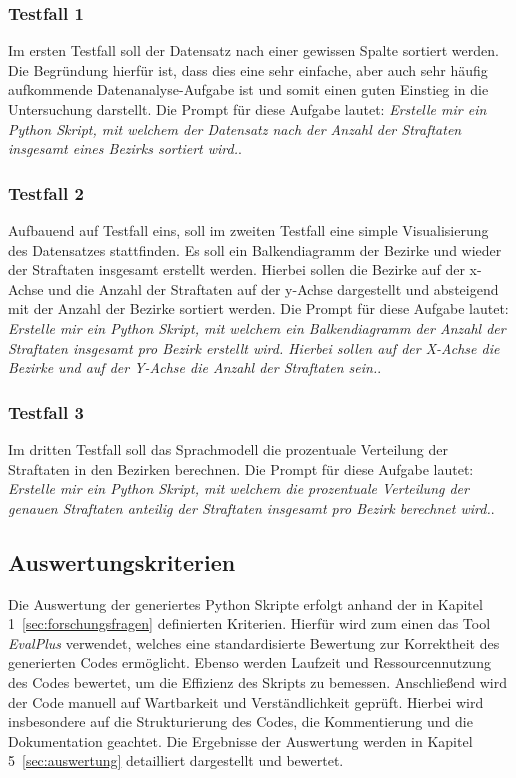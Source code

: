\documentclass[11pt,a4paper]{article}
\begin{document}
\subsubsection{Testfall 1}
    Im ersten Testfall soll der Datensatz nach einer gewissen Spalte sortiert werden. Die Begründung hierfür ist, dass dies eine sehr einfache, aber auch sehr häufig aufkommende Datenanalyse-Aufgabe ist und somit einen guten Einstieg in die Untersuchung darstellt. Die Prompt für diese Aufgabe lautet: \emph{Erstelle mir ein Python Skript, mit welchem der Datensatz nach der Anzahl der Straftaten insgesamt eines Bezirks sortiert wird.}.

\subsubsection{Testfall 2}
    Aufbauend auf Testfall eins, soll im zweiten Testfall eine simple Visualisierung des Datensatzes stattfinden. Es soll ein Balkendiagramm der Bezirke und wieder der Straftaten insgesamt erstellt werden. Hierbei sollen die Bezirke auf der x-Achse und die Anzahl der Straftaten auf der y-Achse dargestellt und absteigend mit der Anzahl der Bezirke sortiert werden. Die Prompt für diese Aufgabe lautet: \emph{Erstelle mir ein Python Skript, mit welchem ein Balkendiagramm der Anzahl der Straftaten insgesamt pro Bezirk erstellt wird. Hierbei sollen auf der X-Achse die Bezirke und auf der Y-Achse die Anzahl der Straftaten sein.}.

\subsubsection{Testfall 3}
    Im dritten Testfall soll das Sprachmodell die prozentuale Verteilung der Straftaten in den Bezirken berechnen. Die Prompt für diese Aufgabe lautet: \emph{Erstelle mir ein Python Skript, mit welchem die prozentuale Verteilung der genauen Straftaten anteilig der Straftaten insgesamt pro Bezirk berechnet wird.}.


\subsection{Auswertungskriterien}
\label{sec:auswertungskriterien}
    Die Auswertung der generiertes Python Skripte erfolgt anhand der in Kapitel 1~\ref{sec:forschungsfragen} definierten Kriterien. Hierfür wird zum einen das Tool \emph{EvalPlus}\cite{evalplus} verwendet, welches eine standardisierte Bewertung zur Korrektheit des generierten Codes ermöglicht. Ebenso werden Laufzeit und Ressourcennutzung des Codes bewertet, um die Effizienz des Skripts zu bemessen.
    Anschließend wird der Code manuell auf Wartbarkeit und Verständlichkeit geprüft. Hierbei wird insbesondere auf die Strukturierung des Codes, die Kommentierung und die Dokumentation geachtet. Die Ergebnisse der Auswertung werden in Kapitel 5~\ref{sec:auswertung} detailliert dargestellt und bewertet.
\end{document}
